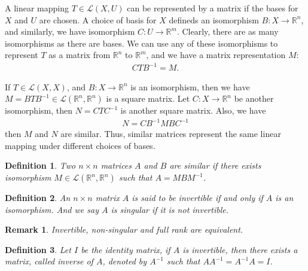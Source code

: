 \documentclass[11pt]{book}
\newtheorem{definition}{Definition}[section]
\newtheorem{remark}{Remark}[section]
\theoremstyle{definition}
\numberwithin{equation}{subsection}
\begin{document}
\medskip

A linear mapping $T\in\mathscr{L}(X,U)$ can be represented by a matrix if the bases for $X$ and $U$ are chosen. A choice of basis for $X$ defineds an isomorphism $B:X\to\mathbb{R}^n$, and similarly, we have isomorphism $C: U\to\mathbb{R}^m$. Clearly, there are as many isomorphisms as there are bases. We can use any of these isomorphisms to represent $T$ as a matrix from $\mathbb{R}^n$ to $\mathbb{R}^m$, and we have a matrix representation $M$:
\begin{align*}
    CTB^{-1} = M.
\end{align*}

If $T\in\mathscr{L}(X,X)$, and $B:X\to\mathbb{R}^n$ is an isomorphism, then we have $M = BTB^{-1}\in\mathscr{L}(\mathbb{R}^n,\mathbb{R}^n)$ is a square matrix. Let $C:X\to\mathbb{R}^n$ be another isomorphism, then $N = CTC^{-1}$ is another square matrix. Also, we have 
\begin{align*}
    N = C B^{-1} M B C^{-1}
\end{align*}
then $M$ and $N$ are similar. Thus, similar matrices represent the same linear mapping under different choices of bases.

\medskip

\begin{definition}
Two $n\times n$ matrices $A$ and $B$ are similar if there exists isomorphism $M\in\mathscr{L}(\mathbb{R}^n,\mathbb{R}^n)$ such that $A = MBM^{-1}$.
\end{definition}

\medskip

\begin{definition}
An $n\times n$ matrix $A$ is said to be invertible if and only if $A$ is an isomorphism. And we say $A$ is singular if it is not invertible.
\end{definition}
\begin{remark}
Invertible, non-singular and full rank are equivalent.
\end{remark}

\medskip

\begin{definition}
Let $I$ be the identity matrix, if $A$ is invertible, then there exists a matrix, called inverse of $A$, denoted by $A^{-1}$ such that $AA^{-1} = A^{-1}A = I$.
\end{definition}

\medskip



\medskip
\end{document}
